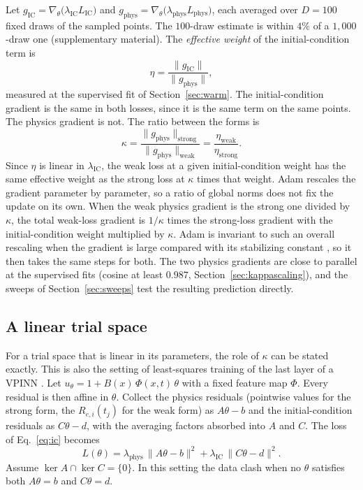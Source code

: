 \documentclass[a4paper,fleqn]{cas-sc}
\begin{document}
Let $g_{\mathrm{IC}}=\nabla_\theta\bigl(\lambda_{\mathrm{IC}}L_{\mathrm{IC}}\bigr)$ and
$g_{\mathrm{phys}}=\nabla_\theta\bigl(\lambda_{\mathrm{phys}}L_{\mathrm{phys}}\bigr)$, each averaged over $D=100$ fixed
draws of the sampled points. The $100$-draw estimate is within $4\%$ of a $1{,}000$-draw one (supplementary material). The \emph{effective weight} of the initial-condition term is
\begin{equation}
\eta = \frac{\|g_{\mathrm{IC}}\|}{\|g_{\mathrm{phys}}\|},
\label{eq:eta}
\end{equation}
measured at the supervised fit of Section~\ref{sec:warm}. The initial-condition gradient is the same in both losses,
since it is the same term on the same points. The physics gradient is not. The ratio between the forms is
\begin{equation}
\kappa = \frac{\|g_{\mathrm{phys}}\|_{\mathrm{strong}}}{\|g_{\mathrm{phys}}\|_{\mathrm{weak}}}
= \frac{\eta_{\mathrm{weak}}}{\eta_{\mathrm{strong}}}.
\label{eq:kappa}
\end{equation}
Since $\eta$ is linear in $\lambda_{\mathrm{IC}}$, the weak loss at a given initial-condition weight has the same
effective weight as the strong loss at $\kappa$ times that weight. Adam rescales the gradient
parameter by parameter, so a ratio of global norms does not fix the update on its own. When the weak physics gradient is the strong one
divided by $\kappa$, the total weak-loss gradient is $1/\kappa$ times the strong-loss gradient with the
initial-condition weight multiplied by $\kappa$. Adam is invariant to such an overall rescaling when the gradient is large
compared with its stabilizing constant \cite{kingma2015adam}, so it then takes the same steps for both. The two physics
gradients are close to parallel at the supervised fits (cosine at least $0.987$, Section~\ref{sec:kappascaling}), and
the sweeps of Section~\ref{sec:sweeps} test the resulting prediction directly.

\subsection{A linear trial space}
\label{sec:prop}

For a trial space that is linear in its parameters, the role of $\kappa$ can be stated exactly. This is also the
setting of least-squares training of the last layer of a VPINN \cite{uriarte2025}. Let
$u_\theta = 1 + B(x)\,\Phi(x,t)\,\theta$ with a fixed feature map $\Phi$. Every residual is then affine in $\theta$.
Collect the physics residuals (pointwise values for the strong form, the $R_{e,i}(t_j)$ for the weak form) as
$A\theta-b$ and the initial-condition residuals as $C\theta-d$, with the averaging factors absorbed into $A$ and $C$.
The loss of Eq.~\eqref{eq:ic} becomes
\begin{equation}
L(\theta) = \lambda_{\mathrm{phys}}\,\|A\theta-b\|^2 + \lambda_{\mathrm{IC}}\,\|C\theta-d\|^2 .
\label{eq:linloss}
\end{equation}
Assume $\ker A\cap\ker C=\{0\}$. In this setting the data clash when no $\theta$ satisfies both $A\theta=b$ and
$C\theta=d$.
\end{document}
